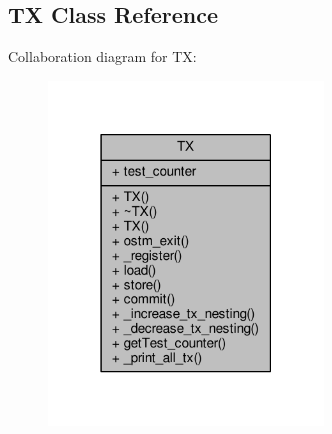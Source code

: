 \hypertarget{class_t_x}{}\subsection{TX Class Reference}
\label{class_t_x}


Collaboration diagram for TX\+:\nopagebreak
\begin{figure}[H]
\begin{center}
\leavevmode
\includegraphics[width=207pt]{class_t_x__coll__graph}
\end{center}
\end{figure}
